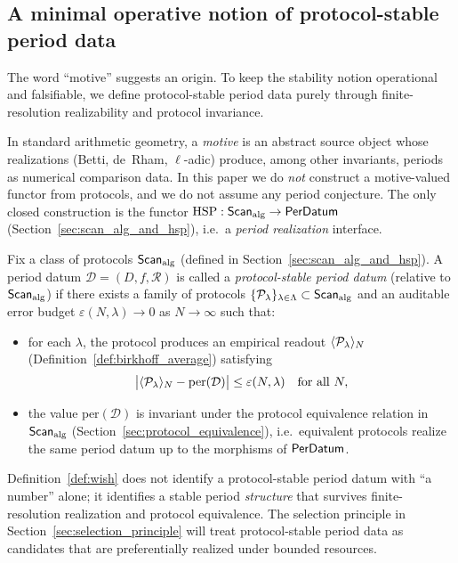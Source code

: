 \subsection{A minimal operative notion of protocol-stable period data}
\label{sec:wish_definition}

The word ``motive'' suggests an origin. To keep the stability notion operational and falsifiable, we define protocol-stable period data purely through finite-resolution realizability and protocol invariance.

\begin{remark}
\label{rem:motive_vs_period}
In standard arithmetic geometry, a \emph{motive} is an abstract source object whose realizations (Betti, de~Rham, $\ell$-adic) produce, among other invariants, periods as numerical comparison data. In this paper we do \emph{not} construct a motive-valued functor from protocols, and we do not assume any period conjecture. The only closed construction is the functor $\mathrm{HSP}:\mathsf{Scan}_{\mathrm{alg}}\to\mathsf{PerDatum}$ (Section~\ref{sec:scan_alg_and_hsp}), i.e.\ a \emph{period realization} interface.
\end{remark}

\begin{definition}
\label{def:wish}
Fix a class of protocols $\mathsf{Scan}_{\mathrm{alg}}$ (defined in Section~\ref{sec:scan_alg_and_hsp}). A period datum $\mathcal{D}=(D,f,\mathcal{R})$ is called a \emph{protocol-stable period datum} (relative to $\mathsf{Scan}_{\mathrm{alg}}$) if there exists a family of protocols $\{\mathcal{P}_\lambda\}_{\lambda\in\Lambda}\subset\mathsf{Scan}_{\mathrm{alg}}$ and an auditable error budget $\varepsilon(N,\lambda)\to 0$ as $N\to\infty$ such that:
\begin{itemize}
\item for each $\lambda$, the protocol produces an empirical readout $\langle \mathcal{P}_\lambda \rangle_N$ (Definition~\ref{def:birkhoff_average}) satisfying
\begin{equation}
\label{eq:wish_realizability}
\big|\langle \mathcal{P}_\lambda \rangle_N - \mathrm{per}(\mathcal{D})\big| \le \varepsilon(N,\lambda)\quad\text{for all }N,
\end{equation}
\item the value $\mathrm{per}(\mathcal{D})$ is invariant under the protocol equivalence relation in $\mathsf{Scan}_{\mathrm{alg}}$ (Section~\ref{sec:protocol_equivalence}), i.e.\ equivalent protocols realize the same period datum up to the morphisms of $\mathsf{PerDatum}$.
\end{itemize}
\end{definition}

Definition~\ref{def:wish} does not identify a protocol-stable period datum with ``a number'' alone; it identifies a stable period \emph{structure} that survives finite-resolution realization and protocol equivalence. The selection principle in Section~\ref{sec:selection_principle} will treat protocol-stable period data as candidates that are preferentially realized under bounded resources.


